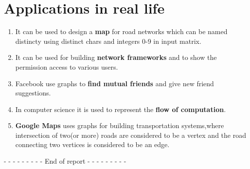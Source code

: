 \documentclass[12pt]{article}
\begin{document}
\section{Applications in real life}
\begin{enumerate}
\item{It can be used to design a \textbf{map} for road networks which can be named distincty using distinct chars and integers 0-9 in input matrix.}
\item{It can be used for building \textbf{network frameworks} and to show the permission access to various users.}
\item{Facebook use graphs to \textbf{find mutual friends} and give new friend suggestions. }
\item{In computer science it is used to represent the \textbf{flow of computation}.}
\item{\textbf{Google Maps} uses graphs for building transportation systems,where intersection of two(or more) roads are considered to be a vertex and the road connecting two vertices is considered to be an edge.}
\end{enumerate}
\quad
\quad
\begin{center}
\quad
\quad
- - - - - - - - - End of report - - - - - - - - -
\end{center}
\end{document}
